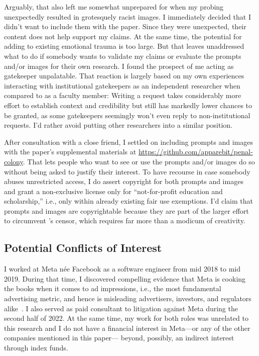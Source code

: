 Arguably, that also left me somewhat unprepared for when my probing unexpectedly
resulted in grotesquely racist images. I immediately decided that I didn't want
to include them with the paper. Since they were unexpected, their content does
not help support my claims. At the same time, the potential for adding to
existing emotional trauma is too large. But that leaves unaddressed what to do
if somebody wants to validate my claims or evaluate the prompts and/or images
for their own research. I found the prospect of me acting as gatekeeper
unpalatable. That reaction is largely based on my own experiences interacting
with institutional gatekeepers as an independent researcher when compared to as
a faculty member: Writing a request takes considerably more effort to establish
context and credibility but still has markedly lower chances to be granted, as
some gatekeepers seemingly won't even reply to non-institutional requests. I'd
rather avoid putting other researchers into a similar position.

After consultation with a close friend, I settled on including prompts and
images with the paper's supplemental materials at
\url{https://github.com/apparebit/penal-colony}. That lets people who want to
see or use the prompts and/or images do so without being asked to justify their
interest. To have recourse in case somebody abuses unrestricted access, I do
assert copyright for both prompts and images and grant a non-exclusive license
only for ``not-for-profit education and scholarship,'' i.e., only within already
existing fair use exemptions. I'd claim that prompts and images are
copyrightable because they are part of the larger effort to circumvent \DALLE's
censor, which requires far more than a modicum of creativity.


\subsection{Potential Conflicts of Interest}

I worked at Meta n\'ee Facebook as a software engineer from mid 2018 to mid
2019. During that time, I discovered compelling evidence that Meta is cooking
the books when it comes to ad impressions, i.e., the most fundamental
advertising metric, and hence is misleading advertisers, investors, and
regulators alike~\cite{Grimm2022a}. I also served as paid consultant to
litigation against Meta during the second half of 2022. At the same time, my
work for both roles was unrelated to this research and I do not have a financial
interest in Meta---or any of the other companies mentioned in this paper---%
beyond, possibly, an indirect interest through index funds.
